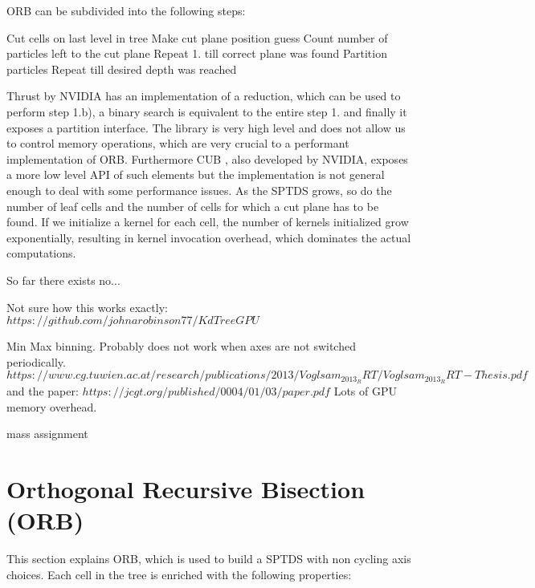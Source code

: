 \documentclass[]{article}
\begin{document}
ORB can be subdivided into the following steps:

\begin{outline}[enumerate]
	\1 Cut cells on last level in tree
	\2 Make cut plane position guess
	\2 Count number of particles left to the cut plane
	\2 Repeat 1. till correct plane was found
	\1 Partition particles
	\1 Repeat till desired depth was reached
\end{outline}

Thrust by NVIDIA \cite{thrust} has an implementation of a reduction, which can be used to perform step 1.b), a binary search is equivalent to the entire step 1. and finally it exposes a partition interface. The library is very high level and does not allow us to control memory operations, which are very crucial to a performant implementation of ORB. 
Furthermore CUB \cite{cub}, also developed by NVIDIA, exposes a more low level API of such elements but the implementation is not general enough to deal with some performance issues. As the SPTDS grows, so do the number of leaf cells and the number of cells for which a cut plane has to be found. If we initialize a kernel for each cell, the number of kernels initialized grow exponentially, resulting in kernel invocation overhead, which dominates the actual computations.


So far there exists no...

Not sure how this works exactly:
$https://github.com/johnarobinson77/KdTreeGPU$

Min Max binning. Probably does not work when axes are not switched periodically.
$https://www.cg.tuwien.ac.at/research/publications/2013/Voglsam_2013_RRT/Voglsam_2013_RRT-Thesis.pdf$
and the paper:
$https://jcgt.org/published/0004/01/03/paper.pdf$ Lots of GPU memory overhead.

mass assignment



\newpage
\section{Orthogonal Recursive Bisection (ORB)} \label{section:orb}


This section explains ORB, which is used to build a SPTDS with non cycling axis choices. Each cell in the tree is enriched with the following properties:
\end{document}
